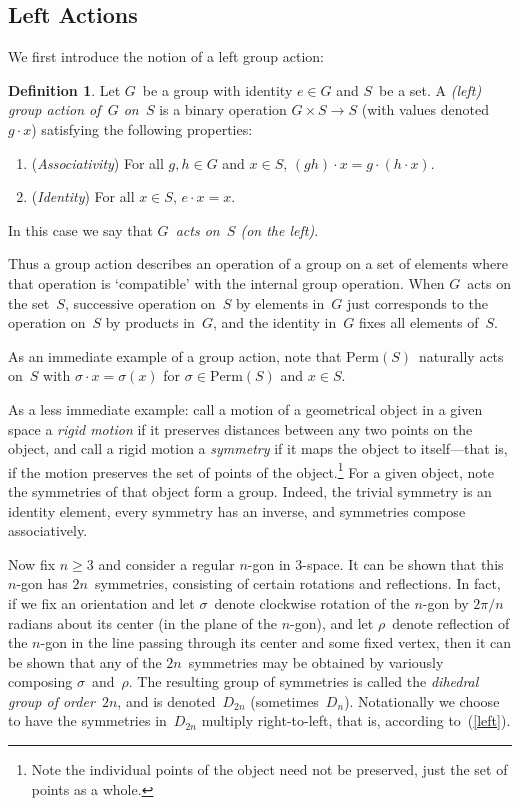 \documentclass[letterpaper]{article}
\theoremstyle{definition}
\newtheorem*{defn}{Definition}
\theoremstyle{plain}
\newcommand{\perm}[1]{\mathrm{Perm}({#1})}
\begin{document}
\subsection*{Left Actions}
We first introduce the notion of a left group action:
\begin{defn}
Let $G$~be a group with identity $e\in G$ and $S$~be a set. A \emph{(left) group action of~$G$ on~$S$} is a binary operation $G\times S\to S$ (with values denoted $g\cdot x$) satisfying the following properties:
\begin{enumerate}[itemsep=0pt]
\item (\emph{Associativity}) For all $g,h\in G$ and $x\in S$, $(gh)\cdot x=g\cdot(h\cdot x)$.
\item (\emph{Identity}) For all $x\in S$, $e\cdot x=x$.
\end{enumerate}
In this case we say that \emph{$G$~acts on~$S$ (on the left)}.
\end{defn}
\noindent Thus a group action describes an operation of a group on a set of elements where that operation is `compatible' with the internal group operation. When $G$~acts on the set~$S$, successive operation on~$S$ by elements in~$G$ just corresponds to the operation on~$S$ by products in~$G$, and the identity in~$G$ fixes all elements of~$S$.

As an immediate example of a group action, note that $\perm{S}$~naturally acts on~$S$ with $\sigma\cdot x=\sigma(x)$ for $\sigma\in\perm{S}$ and $x\in S$.

As a less immediate example: call a motion of a geometrical object in a given space a \emph{rigid motion} if it preserves distances between any two points on the object, and call a rigid motion a \emph{symmetry} if it maps the object to itself---that is, if the motion preserves the set of points of the object.\footnote{Note the individual points of the object need not be preserved, just the set of points as a whole.} For a given object, note the symmetries of that object form a group. Indeed, the trivial symmetry is an identity element, every symmetry has an inverse, and symmetries compose associatively.

Now fix $n\ge3$ and consider a regular $n$-gon in $3$-space. It can be shown that this $n$-gon has $2n$~symmetries, consisting of certain rotations and reflections. In fact, if we fix an orientation and let $\sigma$~denote clockwise rotation of the $n$-gon by $2\pi/n$ radians about its center (in the plane of the $n$-gon), and let $\rho$~denote reflection of the $n$-gon in the line passing through its center and some fixed vertex, then it can be shown that any of the $2n$~symmetries may be obtained by variously composing $\sigma$~and~$\rho$. The resulting group of symmetries is called the \emph{dihedral group of order~$2n$}, and is denoted~$D_{2n}$ (sometimes~$D_n$). Notationally we choose to have the symmetries in~$D_{2n}$ multiply right-to-left, that is, according to~(\ref{left}).
\end{document}
